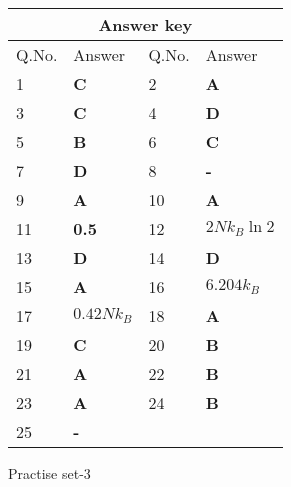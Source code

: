 \setlength\arrayrulewidth{1pt}
\begin{table}[H]
	\centering
	\begin{tabular}{|p{1.5cm}|p{1.5cm}||p{1.5cm}|p{1.5cm}|}
		\hline
		\multicolumn{4}{|c|}{\textbf{Answer key}}\\\hline\hline
		\rowcolor{ocrel}Q.No.&Answer&Q.No.&Answer\\\hline
		1&\textbf{C}&2&\textbf{A}\\ \hline 
		3&\textbf{C}&4&\textbf{D} \\\hline
		5&\textbf{B} &6&\textbf{C} \\\hline
		7&\textbf{D}&8&\textbf{-}\\\hline
		9&\textbf{A}&10&\textbf{A}\\\hline
		11&\textbf{0.5} &12&\textbf{$2 N k_{B} \ln 2$}\\\hline
		13&\textbf{D}&14&\textbf{D}\\\hline
		15&\textbf{A}&16&\textbf{$6.204 k_{B}$} \\\hline
		17&\textbf{$0.42 N k_{B}$}&18&\textbf{A}\\\hline
		19&\textbf{C}&20&\textbf{B}\\\hline
		21&\textbf{A} &22&\textbf{B}\\\hline
		23&\textbf{A}&24&\textbf{B}\\\hline
		25&\textbf{-}& &\\\hline
	\end{tabular}
\end{table}
\newpage
\begin{abox}
	Practise set-3
\end{abox}
